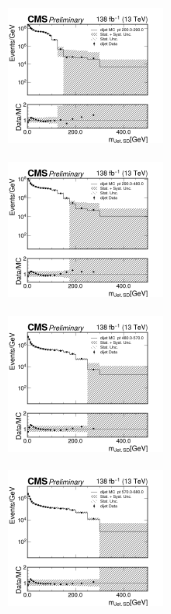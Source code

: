 \begin{figure}[h!]
  \centering
  \begin{subfigure}
    \centering
    \includegraphics[width=0.45\textwidth]{figures/multijet/dijet/dijet_msd_200_290.png}
  \end{subfigure}
  \begin{subfigure}
    \centering
    \includegraphics[width=0.45\textwidth]{figures/multijet/dijet/dijet_msd_290_480.png}
  \end{subfigure}
  \begin{subfigure}
    \centering
    \includegraphics[width=0.45\textwidth]{figures/multijet/dijet/dijet_msd_480_570.png}
  \end{subfigure}
  \begin{subfigure}
    \centering
    \includegraphics[width=0.45\textwidth]{figures/multijet/dijet/dijet_msd_570_680.png}

\end{subfigure}
\end{figure}
